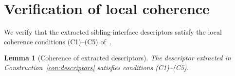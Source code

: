 \documentclass[11pt]{article}
\newtheorem{lemma}[theorem]{Lemma}
\theoremstyle{definition}
\theoremstyle{remark}
\begin{document}
\section{Verification of local coherence}
\label{sec:coherence}

We verify that the extracted sibling-interface descriptors satisfy
the local coherence conditions (C1)--(C5)
of~\cite[Definition~1.8]{SplitForest}.

\begin{lemma}[Coherence of extracted descriptors]\label{lem:coherence}
The descriptor extracted in Construction~\ref{con:descriptors}
satisfies conditions \emph{(C1)--(C5)}.
\end{lemma}
\end{document}
